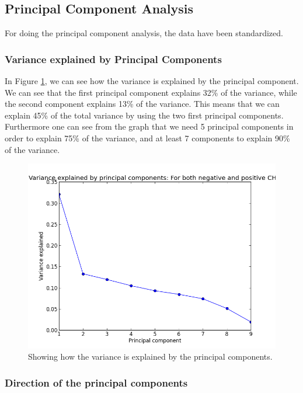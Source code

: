 \subsection{Principal Component Analysis}

For doing the principal component analysis, the data have been standardized.

\subsubsection{Variance explained by Principal Components}

In Figure \ref{VariancePCA}, we can see how the variance is explained by the principal component. We can see that the first principal component explains 32\% of the variance, while the second component explains 13\% of the variance. This means that we can explain 45\% of the total variance by using the two first principal components. Furthermore one can see from the graph that we need 5 principal components in order to explain 75\% of the variance, and at least 7 components to explain 90\% of the variance.

\begin{figure}[H]
\includegraphics[scale=0.75]{pictures/PCAPosAndNeg.png}
\caption{Showing how the variance is explained by the principal components.}
\label{VariancePCA}
\end{figure}

\subsubsection{Direction of the principal components}

